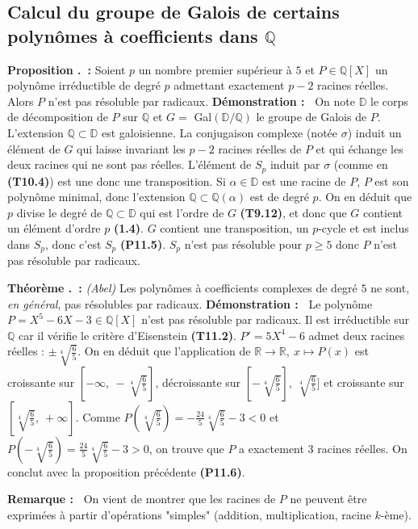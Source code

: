 \documentclass[5pt,a4paper]{article}
\newcounter{prop}[section]
\newcounter{thm}[section]
\renewcommand{\theprop}{\thesection.\arabic{prop}}
\renewcommand{\thethm}{\thesection.\arabic{thm}}
\newcommand{\prop}[1]{\stepcounter{prop}\noindent\textbf{Proposition \theprop ~:} #1 \newline}
\newcommand{\thm}[1]{\stepcounter{thm}\noindent\textbf{Théorème \thethm ~:} #1 \newline}
\newcommand{\demo}[1]{\textbf{Démonstration :~} #1 \newline}
\newcommand{\rmq}[1]{\textbf{Remarque :~} #1 \newline}
\begin{document}
\begin{onehalfspacing}
\subsection{Calcul du groupe de Galois de certains polynômes à coefficients dans $\mathbb{Q}$}

\prop{Soient $p$ un nombre premier supérieur à $5$ et $P \in \mathbb{Q}[X]$ un polynôme irréductible de degré $p$ admettant exactement $p - 2$ racines réelles. Alors $P$ n'est pas résoluble par radicaux.}
\demo{On note $\mathbb{D}$ le corps de décomposition de $P$ sur $\mathbb{Q}$ et $G = $ Gal$(\mathbb{D}/\mathbb{Q})$ le groupe de Galois de $P$. L'extension $\mathbb{Q} \subset \mathbb{D}$ est galoisienne. La conjugaison complexe (notée $\sigma$) induit un élément de $G$ qui laisse invariant les $p - 2$ racines réelles de $P$ et qui échange les deux racines qui ne sont pas réelles. L'élément de $S_p$ induit par $\sigma$ (comme en \textbf{(T10.4)}) est une donc une transposition. Si $\alpha \in \mathbb{D}$ est une racine de $P$, $P$ est son polynôme minimal, donc l'extension $\mathbb{Q} \subset \mathbb{Q}(\alpha)$ est de degré $p$. On en déduit que $p$ divise le degré de $\mathbb{Q} \subset \mathbb{D}$ qui est l'ordre de $G$ \textbf{(T9.12)}, et donc que $G$ contient un élément d'ordre $p$ \textbf{(1.4)}. $G$ contient une transposition,  un $p$-cycle et est inclus dans $S_p$, donc c'est $S_p$ \textbf{(P11.5)}. $S_p$ n'est pas résoluble pour $p \geq 5$ donc $P$ n'est pas résoluble par radicaux.}


\thm{\textit{(Abel)} Les polynômes à coefficients complexes de degré $5$ ne sont, \textit{en général}, pas résolubles par radicaux.}
\demo{Le polynôme $P = X^5 - 6X - 3 \in \mathbb{Q}[X]$ n'est pas résoluble par radicaux. Il est irréductible sur $\mathbb{Q}$ car il vérifie le critère d'Eisenstein \textbf{(T11.2)}. $P' = 5X^4 - 6$ admet deux racines réelles : $\pm \sqrt[4]{\frac{6}{5}}$. On en déduit que l'application de $\mathbb{R} \rightarrow \mathbb{R},~x \mapsto P(x)$ est croissante sur $[-\infty,~-\sqrt[4]{\frac{6}{5}}]$, décroissante sur $[-\sqrt[4]{\frac{6}{5}}],~\sqrt[4]{\frac{6}{5}}]$ et croissante sur $[\sqrt[4]{\frac{6}{5}},~+\infty]$. Comme $P(\sqrt[4]{\frac{6}{5}}) = -\frac{24}{5}\sqrt[4]{\frac{6}{5}} - 3 < 0$ et $P(-\sqrt[4]{\frac{6}{5}}) = \frac{24}{5}\sqrt[4]{\frac{6}{5}} - 3 > 0$, on trouve que $P$ a exactement 3 racines réelles. On conclut avec la proposition précédente \textbf{(P11.6)}.}


\rmq{On vient de montrer que les racines de $P$ ne peuvent être exprimées à partir d'opérations "simples" (addition, multiplication, racine $k$-ème).}



\end{onehalfspacing}
\end{document}
